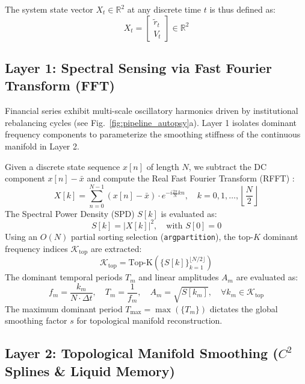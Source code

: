 \documentclass[11pt,a4paper]{article}
\begin{document}
The system state vector $X_t \in \mathbb{R}^2$ at any discrete time $t$ is thus defined as:
\begin{equation}
    X_t = \begin{bmatrix} \tilde{r}_t \\ V_t \end{bmatrix} \in \mathbb{R}^2
\end{equation}

\subsection{Layer 1: Spectral Sensing via Fast Fourier Transform (FFT)}
\label{sec:layer1}

Financial series exhibit multi-scale oscillatory harmonics driven by institutional rebalancing cycles (see Fig.~\ref{fig:pipeline_autopsy}a). Layer 1 isolates dominant frequency components to parameterize the smoothing stiffness of the continuous manifold in Layer 2.

Given a discrete state sequence $x[n]$ of length $N$, we subtract the DC component $x[n] - \bar{x}$ and compute the Real Fast Fourier Transform (RFFT) \cite{cooley1965algorithm}:
\begin{equation}
    X[k] = \sum_{n=0}^{N-1} (x[n] - \bar{x}) \cdot e^{-i \frac{2\pi}{N} k n}, \quad k = 0, 1, \dots, \left\lfloor \frac{N}{2} \right\rfloor
\end{equation}
The Spectral Power Density (SPD) $S[k]$ is evaluated as:
\begin{equation}
    S[k] = |X[k]|^2, \quad \text{with } S[0] = 0
\end{equation}
Using an $O(N)$ partial sorting selection (\texttt{argpartition}), the top-$K$ dominant frequency indices $\mathcal{K}_{\text{top}}$ are extracted:
\begin{equation}
    \mathcal{K}_{\text{top}} = \text{Top-K} \left( \{S[k]\}_{k=1}^{\lfloor N/2 \rfloor} \right)
\end{equation}
The dominant temporal periods $T_m$ and linear amplitudes $A_m$ are evaluated as:
\begin{equation}
    f_m = \frac{k_m}{N \cdot \Delta t}, \quad T_m = \frac{1}{f_m}, \quad A_m = \sqrt{S[k_m]}, \quad \forall k_m \in \mathcal{K}_{\text{top}}
\end{equation}
The maximum dominant period $T_{\text{max}} = \max(\{T_m\})$ dictates the global smoothing factor $s$ for topological manifold reconstruction.

\subsection{Layer 2: Topological Manifold Smoothing ($C^2$ Splines \& Liquid Memory)}
\label{sec:layer2}
\end{document}
